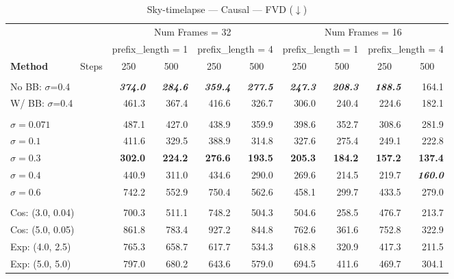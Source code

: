\begin{table}[h]
\centering\tiny
\caption{Sky-timelapse --- Causal --- FVD ($\downarrow$)}
\label{tab:sky_causal_rollout_fvd}
\begin{tabular}{lrrrrrrrr}
\toprule
 & \multicolumn{4}{c}{Num Frames = 32} & \multicolumn{4}{c}{Num Frames = 16} \\
\cmidrule(lr){2-5} \cmidrule(lr){6-9}
 & \multicolumn{2}{c}{prefix\_length = 1} & \multicolumn{2}{c}{prefix\_length = 4} & \multicolumn{2}{c}{prefix\_length = 1} & \multicolumn{2}{c}{prefix\_length = 4} \\
\cmidrule(lr){2-3} \cmidrule(lr){4-5} \cmidrule(lr){6-7} \cmidrule(lr){8-9}
\textbf{Method} \ \ \ \ \ \ Steps & \multicolumn{1}{c}{250} & \multicolumn{1}{c}{500} & \multicolumn{1}{c}{250} & \multicolumn{1}{c}{500} & \multicolumn{1}{c}{250} & \multicolumn{1}{c}{500} & \multicolumn{1}{c}{250} & \multicolumn{1}{c}{500} \\
\midrule
\rowcolor{gray!20} \multicolumn{9}{l}{\textit{ABC}} \\
\quad No BB: $\sigma$=0.4 & \textbf{\textit{374.0}} & \textbf{\textit{284.6}} & \textbf{\textit{359.4}} & \textbf{\textit{277.5}} & \textbf{\textit{247.3}} & \textbf{\textit{208.3}} & \textbf{\textit{188.5}} & 164.1 \\
\quad W/ BB: $\sigma$=0.4 & 461.3 & 367.4 & 416.6 & 326.7 & 306.0 & 240.4 & 224.6 & 182.1 \\
\rowcolor{gray!20} \multicolumn{9}{l}{\textit{Conditional Diffusion Bridge}} \\
\quad $\sigma=0.071$ & 487.1 & 427.0 & 438.9 & 359.9 & 398.6 & 352.7 & 308.6 & 281.9 \\
\quad $\sigma=0.1$ & 411.6 & 329.5 & 388.9 & 314.8 & 327.6 & 275.4 & 249.1 & 222.8 \\
\quad $\sigma=0.3$ & \textbf{302.0} & \textbf{224.2} & \textbf{276.6} & \textbf{193.5} & \textbf{205.3} & \textbf{184.2} & \textbf{157.2} & \textbf{137.4} \\
\quad $\sigma=0.4$ & 440.9 & 311.0 & 434.6 & 290.0 & 269.6 & 214.5 & 219.7 & \textbf{\textit{160.0}} \\
\quad $\sigma=0.6$ & 742.2 & 552.9 & 750.4 & 562.6 & 458.1 & 299.7 & 433.5 & 279.0 \\
\rowcolor{gray!20} \multicolumn{9}{l}{\textit{Noise-to-Data Diffusion}} \\
\quad Cos: (3.0, 0.04) & 700.3 & 511.1 & 748.2 & 504.3 & 504.6 & 258.5 & 476.7 & 213.7 \\
\quad Cos: (5.0, 0.05) & 861.8 & 783.4 & 927.2 & 844.8 & 762.6 & 361.6 & 752.8 & 322.9 \\
\quad Exp: (4.0, 2.5) & 765.3 & 658.7 & 617.7 & 534.3 & 618.8 & 320.9 & 417.3 & 211.5 \\
\quad Exp: (5.0, 5.0) & 797.0 & 680.2 & 643.6 & 579.0 & 694.5 & 411.6 & 469.7 & 304.1 \\
\bottomrule
\end{tabular}
\end{table}

